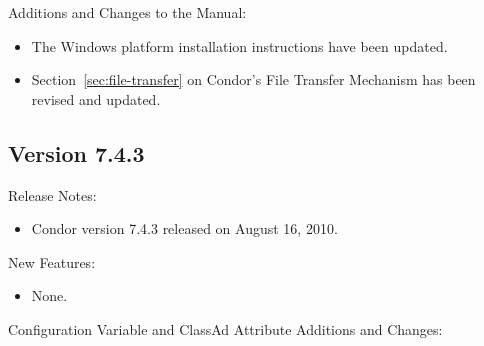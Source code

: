 \noindent Additions and Changes to the Manual:

\begin{itemize}

\item The Windows platform installation instructions have been updated.

\item Section~\ref{sec:file-transfer} on Condor's File Transfer Mechanism
has been revised and updated.

\end{itemize}


\subsection*{\label{sec:New-7-4-3}Version 7.4.3}

\noindent Release Notes:

\begin{itemize}

\item Condor version 7.4.3 released on August 16, 2010.

\end{itemize}


\noindent New Features:

\begin{itemize}

\item None.

\end{itemize}

\noindent Configuration Variable and ClassAd Attribute Additions and Changes:

